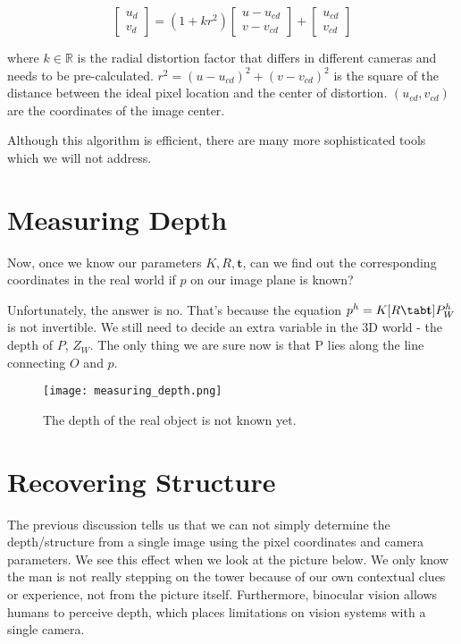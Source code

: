 \documentclass[]{article}
\begin{document}
\begin{equation}
\begin{bmatrix}
    u_d \\
    v_d
\end{bmatrix}
=
(1+kr^2)
\begin{bmatrix}
    u-u_{cd} \\
    v-v_{cd}
\end{bmatrix}
+
\begin{bmatrix}
    u_{cd} \\
    v_{cd}
\end{bmatrix}
\end{equation}

where $k \in \mathbb{R}$ is the radial distortion factor that differs in different cameras and needs to be pre-calculated. $r^2=(u-u_{cd})^2+(v-v_{cd})^2$ is the square of the distance between the ideal pixel location and the center of distortion. $(u_{cd},v_{cd})$ are the coordinates of the image center.

Although this algorithm is efficient, there are many more sophisticated tools which we will not address.

\section{Measuring Depth}
Now, once we know our parameters $K,R,\textbf{t}$, can we find out the corresponding coordinates in the real world if $p$ on our image plane is known?

Unfortunately, the answer is no. That's because the equation $p^h=K[R\tab \textbf{t}]P_W^h$ is not invertible. We still need to decide an extra variable in the 3D world - the depth of $P$, $Z_W$. The only thing we are sure now is that P lies along the line connecting $O$ and $p$.

\begin{figure}[H]
\texttt{[image: measuring\_depth.png]}
\centering
\caption{The depth of the real object is not known yet.}
\label{fig:measuring_depth}
\end{figure}

\section{Recovering Structure}
The previous discussion tells us that we can not simply determine the depth/structure from a single image using the pixel coordinates and camera parameters. We see this effect when we look at the picture below. We only know the man is not really stepping on the tower because of our own contextual clues or experience, not from the picture itself. Furthermore, binocular vision allows humans to perceive depth, which places limitations on vision systems with a single camera.
\end{document}
